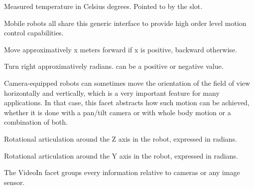 \begin{slots}
  {%
    Measured temperature in Celsius degrees.  Pointed to by the
     slot.%
  }
\end{slots}


Mobile robots all share this generic interface to provide high order
level motion control capabilities.

\begin{slots}
  {%
    Move approximatively x meters forward if x is positive, backward
    otherwise.%
  }

  {%
    Turn right approximatively  radians.   can be a
    positive or negative value.%
  }

\end{slots}


Camera-equipped robots can sometimes move the orientation of the field
of view horizontally and vertically, which is a very important feature
for many applications. In that case, this facet abstracts how such
motion can be achieved, whether it is done with a pan/tilt camera or
with whole body motion or a combination of both.

\begin{slots}
  {%
    Rotational articulation around the Z axis in the robot, expressed
    in radians.%
  }

  {%
    Rotational articulation around the Y axis in the robot, expressed
    in radians.%
  }

\end{slots}


The VideoIn facet groups every information relative to cameras or any
image sensor.

